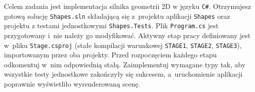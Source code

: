 \documentclass[11pt,a4paper,addpoints]{exam}
\begin{document}
\cellwidth{2.75cm}
\noindent \gradetable[h]

\vspace{0.4cm}

Celem zadania jest implementacja silnika geometrii 2D w języku \texttt{C\#}.
Otrzymujesz gotową solucję \texttt{Shapes.sln} składającą się z~projektu aplikacji \texttt{Shapes} oraz projektu z testami jednostkowymi \texttt{Shapes.Tests}.
Plik \texttt{Program.cs} jest przygotowany i~nie należy go modyfikować.
Aktywny etap pracy definiowany jest w~pliku \texttt{Stage.csproj} (stałe kompilacji warunkowej \texttt{STAGE1}, \texttt{STAGE2}, \texttt{STAGE3}), importowanym przez oba projekty. Przed rozpoczęciem każdego etapu odkomentuj w~nim odpowiednią stałą.
Zaimplementuj wymagane typy tak, aby wszystkie testy jednostkowe zakończyły się sukcesem, a~uruchomienie aplikacji poprawnie wyświetliło wyrenderowaną scenę.
\end{document}
